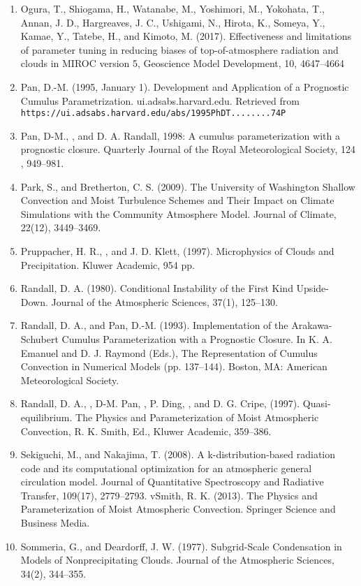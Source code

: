 \begin{enumerate}
\item Ogura, T., Shiogama, H., Watanabe, M., Yoshimori, M., Yokohata, T., Annan, J. D., Hargreaves, J. C., Ushigami, N., Hirota, K., Someya, Y., Kamae, Y., Tatebe, H., and Kimoto, M. (2017). Effectiveness and limitations of parameter tuning in reducing biases of top-of-atmosphere radiation and clouds in MIROC version 5, Geoscience Model Development, 10, 4647–4664
\item Pan, D.-M. (1995, January 1). Development and Application of a Prognostic Cumulus Parametrization. ui.adsabs.harvard.edu. Retrieved from \\
\texttt{https://ui.adsabs.harvard.edu/abs/1995PhDT........74P}
\item Pan, D-M., , and D. A. Randall, 1998: A cumulus parameterization with a prognostic closure. Quarterly Journal of the Royal Meteorological Society, 124 , 949–981.
\item Park, S., and Bretherton, C. S. (2009). The University of Washington Shallow Convection and Moist Turbulence Schemes and Their Impact on Climate Simulations with the Community Atmosphere Model. Journal of Climate, 22(12), 3449–3469.
\item Pruppacher, H. R., , and J. D. Klett, (1997). Microphysics of Clouds and Precipitation. Kluwer Academic, 954 pp.
\item Randall, D. A. (1980). Conditional Instability of the First Kind Upside-Down. Journal of the Atmospheric Sciences, 37(1), 125–130.
\item Randall, D. A., and Pan, D.-M. (1993). Implementation of the Arakawa-Schubert Cumulus Parameterization with a Prognostic Closure. In K. A. Emanuel and D. J. Raymond (Eds.), The Representation of Cumulus Convection in Numerical Models (pp. 137–144). Boston, MA: American Meteorological Society.
\item Randall, D. A., , D-M. Pan, , P. Ding, , and D. G. Cripe, (1997). Quasi-equilibrium. The Physics and Parameterization of Moist Atmospheric Convection, R. K. Smith, Ed., Kluwer Academic, 359–386.
\item Sekiguchi, M., and Nakajima, T. (2008). A k-distribution-based radiation code and its computational optimization for an atmospheric general circulation model. Journal of Quantitative Spectroscopy and Radiative Transfer, 109(17), 2779–2793.
vSmith, R. K. (2013). The Physics and Parameterization of Moist Atmospheric Convection. Springer Science and Business Media.
\item Sommeria, G., and Deardorff, J. W. (1977). Subgrid-Scale Condensation in Models of Nonprecipitating Clouds. Journal of the Atmospheric Sciences, 34(2), 344–355.

\end{enumerate}
